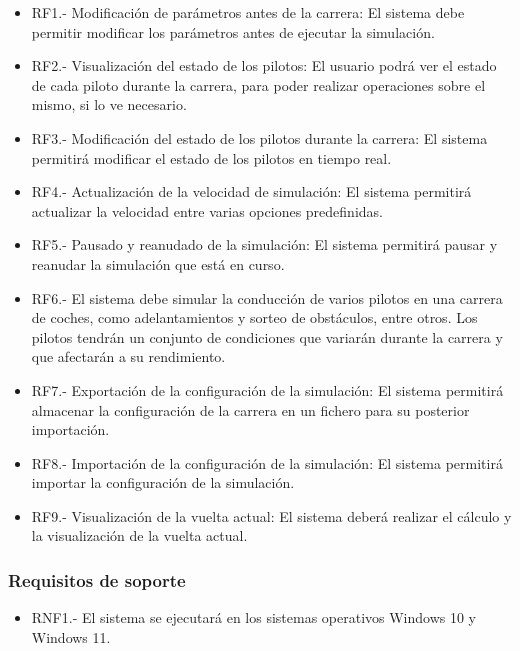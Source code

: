 \begin{itemize}
    \item RF1.- Modificación de parámetros antes de la carrera: El sistema debe permitir modificar los parámetros antes de ejecutar la simulación.
    \item RF2.- Visualización del estado de los pilotos: El usuario podrá ver el estado de cada piloto durante la carrera, para poder realizar operaciones sobre el mismo, si lo ve necesario.
    \item RF3.- Modificación del estado de los pilotos durante la carrera: El sistema permitirá modificar el estado de los pilotos en tiempo real.
    \item RF4.- Actualización de la velocidad de simulación: El sistema permitirá actualizar la velocidad entre varias opciones predefinidas.
    \item RF5.- Pausado y reanudado de la simulación: El sistema permitirá pausar y reanudar la simulación que está en curso.
    \item RF6.- El sistema debe simular la conducción de varios pilotos en una carrera de coches, como adelantamientos y sorteo de obstáculos, entre otros. Los pilotos tendrán un conjunto de condiciones que variarán durante la carrera y que afectarán a su rendimiento.
    \item RF7.- Exportación de la configuración de la simulación: El sistema permitirá almacenar la configuración de la carrera en un fichero para su posterior importación.
    \item RF8.- Importación de la configuración de la simulación: El sistema permitirá importar la configuración de la simulación.
    \item RF9.- Visualización de la vuelta actual: El sistema deberá realizar el cálculo y la visualización de la vuelta actual.
\end{itemize}


\subsubsection{Requisitos de soporte}

\begin{itemize}
    \item RNF1.- El sistema se ejecutará en los sistemas operativos Windows 10 y Windows 11.
\end{itemize}

